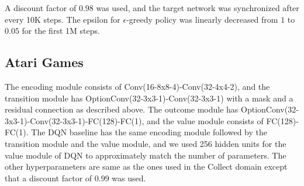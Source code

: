 \documentclass{article}
\begin{document}
A discount factor of $0.98$ was used, and the target network was synchronized after every 10K steps. The epsilon for $\epsilon$-greedy policy was linearly decreased from $1$ to $0.05$ for the first 1M steps.

\subsection{Atari Games}
The encoding module consists of Conv(16-8x8-4)-Conv(32-4x4-2), and the transition module has OptionConv(32-3x3-1)-Conv(32-3x3-1) with a mask and a residual connection as described above. The outcome module has OptionConv(32-3x3-1)-Conv(32-3x3-1)-FC(128)-FC(1), and the value module consists of FC(128)-FC(1). The DQN baseline has the same encoding module followed by the transition module and the value module, and we used 256 hidden units for the value module of DQN to approximately match the number of parameters. The other hyperparameters are same as the ones used in the Collect domain except that a discount factor of $0.99$ was used. 
\end{document}
